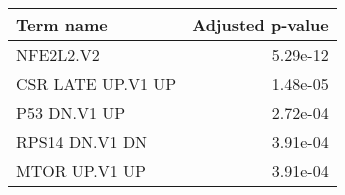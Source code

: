 \begin{tabular}{lr}
\toprule
        Term name &  Adjusted p-value \\
\midrule
        NFE2L2.V2 &          5.29e-12 \\
CSR LATE UP.V1 UP &          1.48e-05 \\
     P53 DN.V1 UP &          2.72e-04 \\
   RPS14 DN.V1 DN &          3.91e-04 \\
    MTOR UP.V1 UP &          3.91e-04 \\
\bottomrule
\end{tabular}
